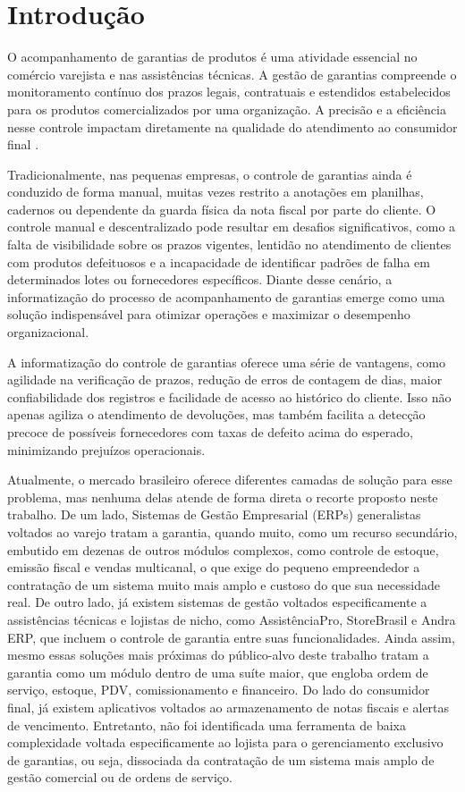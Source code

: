 \chapter{Introdução}\label{Introducao}

O acompanhamento de garantias de produtos é uma atividade essencial no comércio varejista e nas assistências técnicas. A gestão de garantias compreende o monitoramento contínuo dos prazos legais, contratuais e estendidos estabelecidos para os produtos comercializados por uma organização. A precisão e a eficiência nesse controle impactam diretamente na qualidade do atendimento ao consumidor final \citep{Brasilcdc}.

Tradicionalmente, nas pequenas empresas, o controle de garantias ainda é conduzido de forma manual, muitas vezes restrito a anotações em planilhas, cadernos ou dependente da guarda física da nota fiscal por parte do cliente. O controle manual e descentralizado pode resultar em desafios significativos, como a falta de visibilidade sobre os prazos vigentes, lentidão no atendimento de clientes com produtos defeituosos e a incapacidade de identificar padrões de falha em determinados lotes ou fornecedores específicos. Diante desse cenário, a informatização do processo de acompanhamento de garantias emerge como uma solução indispensável para otimizar operações e maximizar o desempenho organizacional.

A informatização do controle de garantias oferece uma série de vantagens, como agilidade na verificação de prazos, redução de erros de contagem de dias, maior confiabilidade dos registros e facilidade de acesso ao histórico do cliente. Isso não apenas agiliza o atendimento de devoluções, mas também facilita a detecção precoce de possíveis fornecedores com taxas de defeito acima do esperado, minimizando prejuízos operacionais.

Atualmente, o mercado brasileiro oferece diferentes camadas de solução para esse problema, mas nenhuma delas atende de forma direta o recorte proposto neste trabalho. De um lado, Sistemas de Gestão Empresarial (ERPs) generalistas voltados ao varejo tratam a garantia, quando muito, como um recurso secundário, embutido em dezenas de outros módulos complexos, como controle de estoque, emissão fiscal e vendas multicanal, o que exige do pequeno empreendedor a contratação de um sistema muito mais amplo e custoso do que sua necessidade real. De outro lado, já existem sistemas de gestão voltados especificamente a assistências técnicas e lojistas de nicho, como AssistênciaPro, StoreBrasil e Andra ERP, que incluem o controle de garantia entre suas funcionalidades. Ainda assim, mesmo essas soluções mais próximas do público-alvo deste trabalho tratam a garantia como um módulo dentro de uma suíte maior, que engloba ordem de serviço, estoque, PDV, comissionamento e financeiro. Do lado do consumidor final, já existem aplicativos voltados ao armazenamento de notas fiscais e alertas de vencimento. Entretanto, não foi identificada uma ferramenta de baixa complexidade voltada especificamente ao lojista para o gerenciamento exclusivo de garantias, ou seja, dissociada da contratação de um sistema mais amplo de gestão comercial ou de ordens de serviço.

